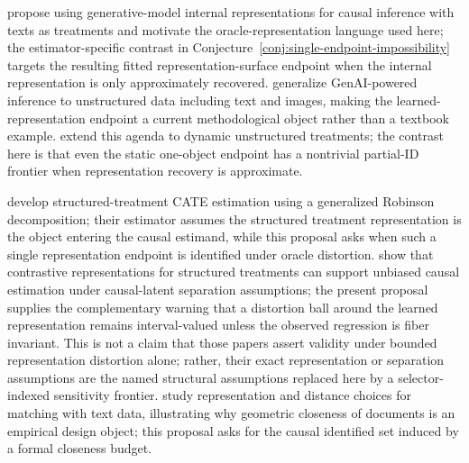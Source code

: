 \documentclass[11pt]{article}
\theoremstyle{definition}
\theoremstyle{plain}
\theoremstyle{remark}
\begin{document}
\citet{ImaiNakamura2024TextTreatments} propose using generative-model internal representations for causal inference with texts as treatments and motivate the oracle-representation language used here; the estimator-specific contrast in Conjecture~\ref{conj:single-endpoint-impossibility} targets the resulting fitted representation-surface endpoint when the internal representation is only approximately recovered.  \citet{ImaiNakamura2025GPI} generalize GenAI-powered inference to unstructured data including text and images, making the learned-representation endpoint a current methodological object rather than a textbook example.  \citet{ImaiNakamura2026Dynamic} extend this agenda to dynamic unstructured treatments; the contrast here is that even the static one-object endpoint has a nontrivial partial-ID frontier when representation recovery is approximate.

\citet{KaddourZhuLiuKusnerSilva2021} develop structured-treatment CATE estimation using a generalized Robinson decomposition; their estimator assumes the structured treatment representation is the object entering the causal estimand, while this proposal asks when such a single representation endpoint is identified under oracle distortion.  \citet{CorcollAndreuVlontzosORiordanGilliganLee2026} show that contrastive representations for structured treatments can support unbiased causal estimation under causal-latent separation assumptions; the present proposal supplies the complementary warning that a distortion ball around the learned representation remains interval-valued unless the observed regression is fiber invariant.  This is not a claim that those papers assert validity under bounded representation distortion alone; rather, their exact representation or separation assumptions are the named structural assumptions replaced here by a selector-indexed sensitivity frontier.  \citet{MozerMiratrixKaufmanAnastasopoulos2020} study representation and distance choices for matching with text data, illustrating why geometric closeness of documents is an empirical design object; this proposal asks for the causal identified set induced by a formal closeness budget.
\end{document}
